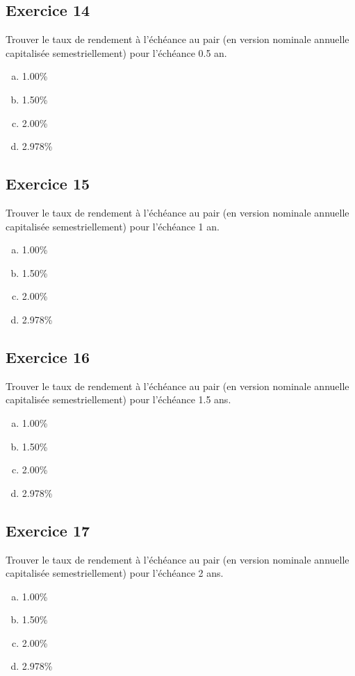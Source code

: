 \documentclass[10pt,a4paper]{article}
\begin{document}
\subsection*{Exercice 14}
Trouver le taux de rendement à l'échéance au pair (en version nominale annuelle capitalisée semestriellement) pour l'échéance 0.5 an.

\begin{enumerate}[a)]
\item 1.00\%
\item 1.50\%
\item 2.00\%
\item 2.978\%
\end{enumerate}


\subsection*{Exercice 15}
Trouver le taux de rendement à l'échéance au pair (en version nominale annuelle capitalisée semestriellement) pour l'échéance 1 an.


\begin{enumerate}[a)]
\item 1.00\%
\item 1.50\%
\item 2.00\%
\item 2.978\%
\end{enumerate}

\subsection*{Exercice 16}
Trouver le taux de rendement à l'échéance au pair (en version nominale annuelle capitalisée semestriellement) pour l'échéance 1.5 ans.


\begin{enumerate}[a)]
\item 1.00\%
\item 1.50\%
\item 2.00\%
\item 2.978\%
\end{enumerate}



\subsection*{Exercice 17}
Trouver le taux de rendement à l'échéance au pair (en version nominale annuelle capitalisée semestriellement) pour l'échéance 2 ans.


\begin{enumerate}[a)]
\item 1.00\%
\item 1.50\%
\item 2.00\%
\item 2.978\%
\end{enumerate}
\end{document}

